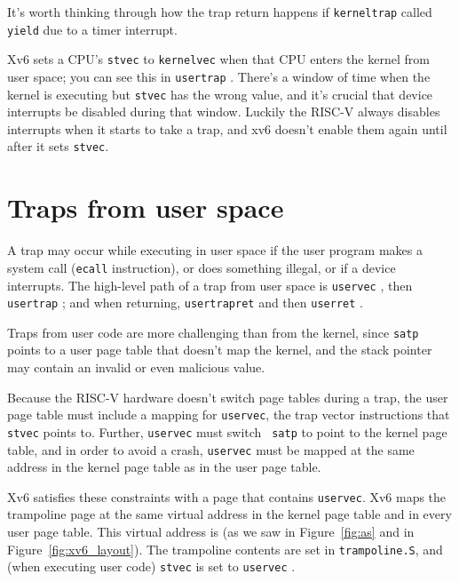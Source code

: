 It's worth thinking through how the trap return happens if
{\tt kerneltrap} called {\tt yield} due to a timer interrupt.

Xv6 sets a CPU's {\tt stvec} to {\tt kernelvec} when that CPU
enters the kernel from user space; you can see this in {\tt usertrap}
.
There's a window of time when the kernel is executing
but {\tt stvec} has the wrong value, and it's crucial that device
interrupts be disabled during that window.
Luckily the RISC-V always disables interrupts when it starts
to take a trap, and xv6 doesn't enable them again until
after it sets {\tt stvec}.

\section{Traps from user space}

A trap may occur while executing in user space if the
user program makes a
system call ({\tt ecall} instruction), or does something
illegal, or if a device interrupts.
The high-level path of a trap from user space is
{\tt uservec}
,
then {\tt usertrap}
;
and when returning,
{\tt usertrapret}
and then
{\tt userret}
.

Traps from user code are more challenging than from the kernel, since
{\tt satp} points to a user page table that doesn't map the 
kernel, and the stack pointer may contain an invalid or even malicious
value.

Because the RISC-V hardware doesn't switch page tables during a trap,
the user page table must include a mapping for {\tt uservec},
the trap vector
instructions that {\tt stvec} points to. Further, {\tt uservec}
must switch {\tt
  satp} to point to the kernel page table, and in order to avoid a
crash, {\tt uservec} must be mapped at the same address in the
kernel page table as in the user page table.

Xv6 satisfies these constraints with a  page
that contains {\tt uservec}. Xv6 maps the trampoline page at
the same virtual address in the kernel page table and in every user
page table. This virtual address is  (as we saw
in Figure~\ref{fig:as} and in Figure~\ref{fig:xv6_layout}). The
trampoline contents are set in {\tt trampoline.S},
and (when executing user code) {\tt stvec} is set to
{\tt uservec}
.

